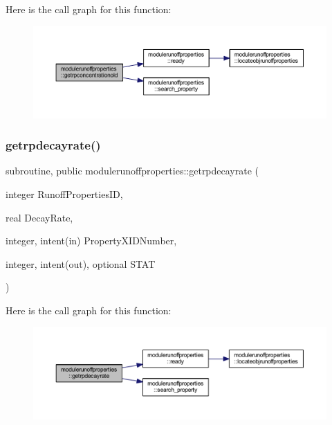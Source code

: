 Here is the call graph for this function\+:\nopagebreak
\begin{figure}[H]
\begin{center}
\leavevmode
\includegraphics[width=350pt]{namespacemodulerunoffproperties_a2a7cc1e8991c2e54574415d7f00a5874_cgraph}
\end{center}
\end{figure}
\mbox{\label{namespacemodulerunoffproperties_a948f11bb3ded4d5dcba4b7d9ddb002f9}} 
\subsubsection{\texorpdfstring{getrpdecayrate()}{getrpdecayrate()}}
{\footnotesize\ttfamily subroutine, public modulerunoffproperties\+::getrpdecayrate (\begin{DoxyParamCaption}\item[{integer}]{Runoff\+Properties\+ID,  }\item[{real}]{Decay\+Rate,  }\item[{integer, intent(in)}]{Property\+X\+I\+D\+Number,  }\item[{integer, intent(out), optional}]{S\+T\+AT }\end{DoxyParamCaption})}

Here is the call graph for this function\+:\nopagebreak
\begin{figure}[H]
\begin{center}
\leavevmode
\includegraphics[width=350pt]{namespacemodulerunoffproperties_a948f11bb3ded4d5dcba4b7d9ddb002f9_cgraph}
\end{center}
\end{figure}
\mbox{\label{namespacemodulerunoffproperties_a9588522d88fead0d0a355bc1c32062b9}} 
